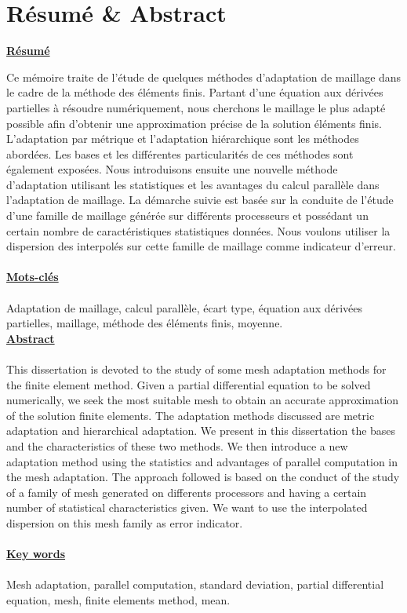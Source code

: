 \chapter*{Résumé \& Abstract}
\Large
\begin{flushleft}
\textbf{\underline{Résumé}}
\end{flushleft}
\normalsize
Ce mémoire traite de l'étude de quelques méthodes d'adaptation de maillage dans le cadre de la méthode des éléments finis. Partant d'une équation aux dérivées partielles à résoudre numériquement, nous cherchons le maillage le plus adapté possible afin d'obtenir une approximation précise de la solution éléments finis. L'adaptation par métrique et l'adaptation hiérarchique sont les méthodes abordées. Les bases et les différentes particularités de ces méthodes sont également exposées. Nous introduisons ensuite une nouvelle méthode d'adaptation utilisant les statistiques et les avantages du calcul parallèle dans l'adaptation de maillage. La démarche suivie est basée sur la conduite de l'étude d'une famille de maillage générée sur différents processeurs et possédant un certain nombre de caractéristiques statistiques données. Nous voulons utiliser la dispersion des interpolés sur cette famille de maillage comme indicateur d'erreur.\\\\
\Large\textbf{\underline{Mots-clés}}\normalsize\\\\
Adaptation de maillage, calcul parallèle, écart type, équation aux dérivées partielles, maillage, méthode des éléments finis, moyenne.
\[\]\[\]\[\]
\Large\textbf{\underline{Abstract}}\\\\\normalsize
This dissertation is devoted to the study of some mesh adaptation methods for the finite element method. Given a partial differential equation to be solved numerically, we seek the most suitable mesh to obtain an accurate approximation of the solution finite elements. The adaptation methods discussed are metric adaptation and hierarchical adaptation. We present in this dissertation the bases and the characteristics of these two methods. We then introduce a new adaptation method using the statistics and advantages of parallel computation in the mesh adaptation. The approach followed is based on the conduct of the study of a family of mesh generated on differents processors and having a certain number of statistical characteristics given. We want to use the interpolated dispersion on this mesh family as error indicator.\\\\
\Large\textbf{\underline{Key words}}\normalsize\\\\
Mesh adaptation, parallel computation, standard deviation, partial differential equation, mesh, finite elements method, mean.